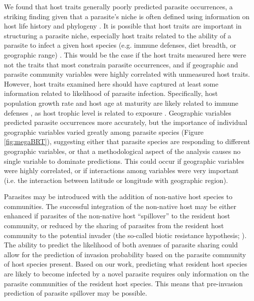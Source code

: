 \documentclass[12pt]{article}
\begin{document}
  
 We found that host traits generally poorly predicted parasite occurrences, a striking finding given that a parasite's niche is often defined using information on host life history and phylogeny \citep{strona2012, rohde1993}. It is possible that host traits are important in structuring a parasite niche, especially host traits related to the ability of a parasite to infect a given host species (e.g. immune defenses, diet breadth, or geographic range) \citep{johnson2012}. This would be the case if the host traits measured here were not the traits that most constrain parasite occurrences, and if geographic and parasite community variables were highly correlated with unmeasured host traits. However, host traits examined here should have captured at least some information related to likelihood of parasite infection. Specifically, host population growth rate and host age at maturity are likely related to immune defenses \citep{zuk2002}, as host trophic level is related to exposure \citep{price1990}. Geographic variables predicted parasite occurrences more accurately, but the importance of individual geographic variables varied greatly among parasite species (Figure \ref{fig:megaBRT}), suggesting either that parasite species are responding to different geographic variables, or that a methodological aspect of the analysis causes no single variable to dominate predictions. This could occur if geographic variables were highly correlated, or if interactions among variables were very important (i.e. the interaction between latitude or longitude with geographic region). 
 
   
 Parasites may be introduced with the addition of non-native host species to communities. The successful integration of the non-native host may be either enhanced if parasites of the non-native host ``spillover'' to the resident host community, or reduced by the sharing of parasites from the resident host community to the potential invader (the so-called biotic resistance hypothesis; \citet{britton2013}). The ability to predict the likelihood of both avenues of parasite sharing could allow for the prediction of invasion probability based on the parasite community of host species present. Based on our work, predicting what resident host species are likely to become infected by a novel parasite requires only information on the parasite communities of the resident host species. This means that pre-invasion prediction of parasite spillover may be possible.  
 
  
  
  
  
\end{document}
